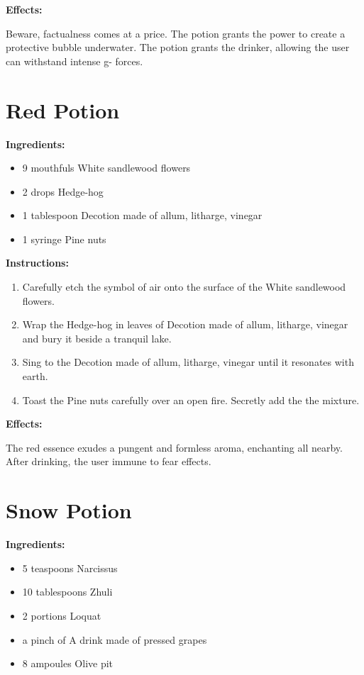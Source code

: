 \documentclass{article}
\begin{document}
\textbf{Effects:}

Beware, factualness comes at a price. The potion grants the power to create a protective bubble underwater. The potion grants the drinker, allowing the user can withstand intense g- forces.

\newpage
\section*{Red Potion}

\textbf{Ingredients:}

\begin{itemize}
  \item 9 mouthfuls White sandlewood flowers
  \item 2 drops Hedge-hog
  \item 1 tablespoon Decotion made of allum, litharge, vinegar
  \item 1 syringe Pine nuts
\end{itemize}

\textbf{Instructions:}

\begin{enumerate}
  \item Carefully etch the symbol of air onto the surface of the White sandlewood flowers.
  \item Wrap the Hedge-hog in leaves of Decotion made of allum, litharge, vinegar and bury it beside a tranquil lake.
  \item Sing to the Decotion made of allum, litharge, vinegar until it resonates with earth.
  \item Toast the Pine nuts carefully over an open fire. Secretly add the the mixture.
\end{enumerate}

\textbf{Effects:}

The red essence exudes a pungent and formless aroma, enchanting all nearby. After drinking, the user immune to fear effects.

\newpage
\section*{Snow Potion}

\textbf{Ingredients:}

\begin{itemize}
  \item 5 teaspoons Narcissus
  \item 10 tablespoons Zhuli
  \item 2 portions Loquat
  \item a pinch of A drink made of pressed grapes
  \item 8 ampoules Olive pit
\end{itemize}
\end{document}
